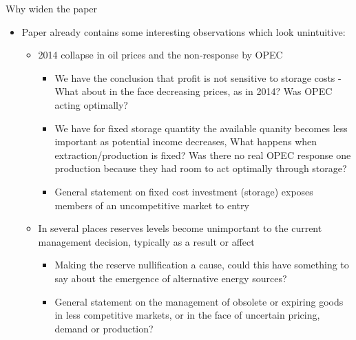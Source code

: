 \documentclass[xcolor=table]{beamer}
\begin{document}
\begin{frame}{Why widen the paper}
	\begin{itemize}[<+->]
		\item Paper already contains some interesting observations which look unintuitive:
		\begin{itemize}[<+->]
			\item 2014 collapse in oil prices and the non-response by OPEC
			\begin{itemize}[<+->]
				\item We have the conclusion that profit is not sensitive to storage costs - What about in the face decreasing prices, as in 2014? Was OPEC acting optimally?
				\item We have for fixed storage quantity the available quanity becomes less important as potential income decreases, What happens when extraction/production is fixed? Was there no real OPEC response one production because they had room to act optimally through storage?
				\item General statement on fixed cost investment (storage) exposes members of an uncompetitive market to entry
			\end{itemize}
			\item In several places reserves levels become unimportant to the current management decision, typically as a result or affect
			\begin{itemize}[<+->]
				\item Making the reserve nullification a cause, could this have something to say about the emergence of alternative energy sources? 
				\item General statement on the management of obsolete or expiring goods in less competitive markets, or in the face of uncertain pricing, demand or production?
			\end{itemize} 
		\end{itemize}
	\end{itemize}
\end{frame}
\end{document}

